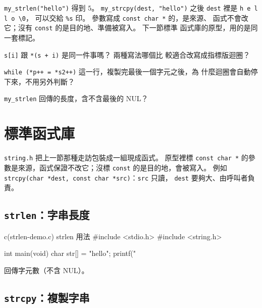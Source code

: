 
\texttt{my\_strlen("hello")} 得到 $5$。 \texttt{my\_strcpy(dest,
"hello")} 之後 \texttt{dest} 裡是 \texttt{h e l l o \textbackslash 0}，
可以交給 \texttt{\%s} 印。 參數寫成 \texttt{const char *} 的，是來源、
函式不會改它；沒有 \texttt{const} 的是目的地、準備被寫入。 下一節標準
函式庫的原型，用的是同一套標記。


\begin{drills}[label=drills:str-diy-functions]
\item \texttt{s[i]} 跟 \texttt{*(s + i)} 是同一件事嗎？ 兩種寫法哪個比
較適合改寫成指標版迴圈？
\item \texttt{while (*p++ = *s2++)} 這一行，複製完最後一個字元之後，為
什麼迴圈會自動停下來，不用另外判斷？
\item \texttt{my\_strlen} 回傳的長度，含不含最後的 NUL？
\end{drills}

\section{標準函式庫}
\label{sec:str-stdlib}

\texttt{string.h} 把上一節那種走訪包裝成一組現成函式。 原型裡標
\texttt{const char *} 的參數是來源，函式保證不改它；沒標
\texttt{const} 的是目的地，會被寫入。 例如
\texttt{strcpy(char *dest, const char *src)}：\texttt{src} 只讀，
\texttt{dest} 要夠大、由呼叫者負責。

\subsection{\texttt{strlen}：字串長度}

\begin{example}{c}{(strlen-demo.c) strlen 用法}
#include <stdio.h>
#include <string.h>

int main(void) {
    char str[] = "hello";
    printf("%
}
\end{example}


回傳字元數（不含 NUL）。

\subsection{\texttt{strcpy}：複製字串}

